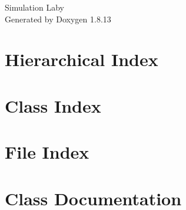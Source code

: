 \documentclass[twoside]{book}
\newcommand{\+}{\discretionary{\mbox{\scriptsize$\hookleftarrow$}}{}{}}
\newcommand{\clearemptydoublepage}{%
  \newpage{\pagestyle{empty}\cleardoublepage}%
}
\begin{document}
\hypersetup{pageanchor=false,
             bookmarksnumbered=true,
             pdfencoding=unicode
            }
\begin{titlepage}
\vspace*{7cm}
\begin{center}%
{\Large Simulation Laby }\\
\vspace*{1cm}
{\large Generated by Doxygen 1.8.13}\\
\end{center}
\end{titlepage}
\clearemptydoublepage
{}
\tableofcontents
\clearemptydoublepage
{}
\hypersetup{pageanchor=true}

\chapter{Hierarchical Index}

\chapter{Class Index}

\chapter{File Index}

\chapter{Class Documentation}









\end{document}
